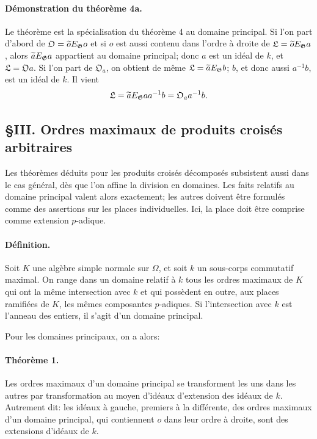 \paragraph{Démonstration du théorème 4a.}
Le théorème est la spécialisation du théorème 4 au domaine principal. Si l'on part d'abord de \(\mathfrak O=\widetilde oE_\mathfrak G o\) et si \(o\) est aussi contenu dans l'ordre à droite de \(\mathfrak L=\widetilde oE_\mathfrak G a\), alors \(\widetilde aE_\mathfrak G a\) appartient au domaine principal; donc \(a\) est un idéal de \(k\), et \(\mathfrak L=\mathfrak O a\). Si l'on part de \(\mathfrak O_a\), on obtient de même \(\mathfrak L=\widetilde aE_\mathfrak G b\); \(b\), et donc aussi \(a^{-1}b\), est un idéal de \(k\). Il vient
\[
        \mathfrak L=\widetilde aE_\mathfrak G aa^{-1}b
        =\mathfrak O_a a^{-1}b.
\]

\subsection*{\S{}III. Ordres maximaux de produits croisés arbitraires}

Les théorèmes déduits pour les produits croisés décomposés subsistent aussi dans le cas général, dès que l'on affine la division en domaines. Les faits relatifs au domaine principal valent alors exactement; les autres doivent être formulés comme des assertions sur les places individuelles. Ici, la place doit être comprise comme extension \(p\)-adique.

\paragraph{Définition.}
Soit \(K\) une algèbre simple normale sur \(\Omega\), et soit \(k\) un sous-corps commutatif maximal. On range dans un domaine relatif à \(k\) tous les ordres maximaux de \(K\) qui ont la même intersection avec \(k\) et qui possèdent en outre, aux places ramifiées de \(K\), les mêmes composantes \(p\)-adiques. Si l'intersection avec \(k\) est l'anneau des entiers, il s'agit d'un domaine principal.

Pour les domaines principaux, on a alors:

\paragraph{Théorème 1.}
Les ordres maximaux d'un domaine principal se transforment les uns dans les autres par transformation au moyen d'idéaux d'extension des idéaux de \(k\). Autrement dit: les idéaux à gauche, premiers à la différente, des ordres maximaux d'un domaine principal, qui contiennent \(o\) dans leur ordre à droite, sont des extensions d'idéaux de \(k\).

